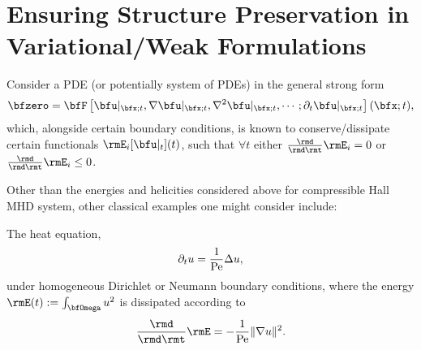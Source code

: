 \section{Ensuring Structure Preservation in Variational/Weak Formulations}

    Consider a PDE (or potentially system of PDEs) in the general strong form
    \begin{equation}
        \bfzero  =  \bfF\left[\bfu|_{\bfx; t}, \nabla\bfu|_{\bfx; t}, \nabla^{2}\bfu|_{\bfx; t}, \cdots; \partial_{t}\bfu|_{\bfx; t}\right](\bfx; t),
    \end{equation}
    which, alongside certain boundary conditions, is known to conserve/dissipate certain functionals $\rmE_{i}[\bfu|_{t}](t)$, such that $\forall  t$ either $\frac{\rmd}{\rmd\rmt}\rmE_{i}  =  0$ or $\frac{\rmd}{\rmd\rmt}\rmE_{i}  \leq  0$.
    
    \line
    
    Other than the energies and helicities considered above for compressible Hall MHD system, other classical examples one might consider include:
    \begin{example}
        The heat equation,
        \begin{equation}
            \partial_{t}u  =  \frac{1}{\mathrm{Pe}}\Delta u,
        \end{equation}
        under homogeneous Dirichlet or Neumann boundary conditions, where the energy $\rmE(t)  :=  \int_{\bfOmega}u^{2}$ is dissipated according to
        \begin{equation}
            \frac{\rmd}{\rmd\rmt}\rmE  =  - \frac{1}{\rmPe}\|\nabla u\|^{2}.
        \end{equation}
    \end{example}
    
